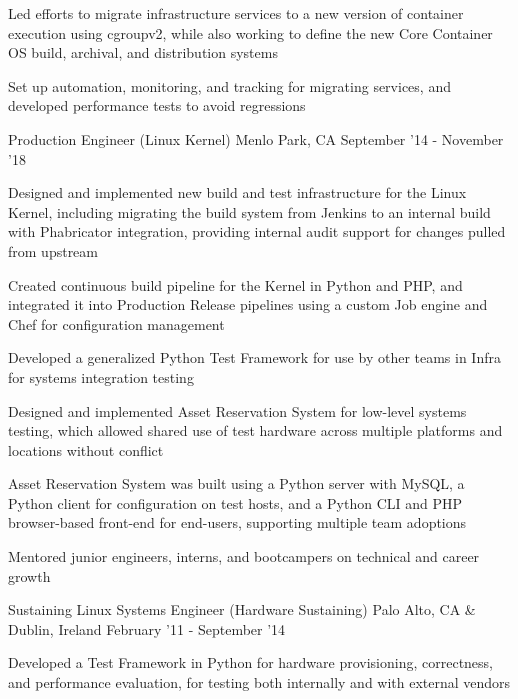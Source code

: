 \begin{cventries}
{\begin{cvitems}
		  \item Led efforts to migrate infrastructure services to a new version of container execution using cgroupv2, while also working to define the new Core Container OS build, archival, and distribution systems
		  \item Set up automation, monitoring, and tracking for migrating services, and developed performance tests to avoid regressions
        \end{cvitems}
    }
\vspace{0mm}
\cventry
	{Production Engineer \color{solarized-orange}(Linux Kernel)} %
    {} %
    {Menlo Park, CA} %
    {September '14 - November '18} %
    {
        \begin{cvitems}
		  \item Designed and implemented new build and test infrastructure for the Linux Kernel, including migrating the build system from Jenkins to an internal build with Phabricator integration, providing internal audit support for changes pulled from upstream
		  \item Created continuous build pipeline for the Kernel in Python and PHP, and integrated it into Production Release pipelines using a custom Job engine and Chef for configuration management
		  \item Developed a generalized Python Test Framework for use by other teams in Infra for systems integration testing
		  \item Designed and implemented Asset Reservation System for low-level systems testing, which allowed shared use of test hardware across multiple platforms and locations without conflict
		  \item Asset Reservation System was built using a Python server with MySQL, a Python client for configuration on test hosts, and a Python CLI and PHP browser-based front-end for end-users, supporting multiple team adoptions
          \item Mentored junior engineers, interns, and bootcampers on technical and career growth
        \end{cvitems}
    }
\vspace{0mm}
\cventry
	{Sustaining Linux Systems Engineer \color{solarized-orange}(Hardware Sustaining)} %
    {} %
	{Palo Alto, CA \& Dublin, Ireland} %
    {February '11 - September '14} %
    {
        \begin{cvitems}
		  \item Developed a Test Framework in Python for hardware provisioning, correctness, and performance evaluation, for testing both internally and with external vendors

\end{cvitems}}
\end{cventries}
